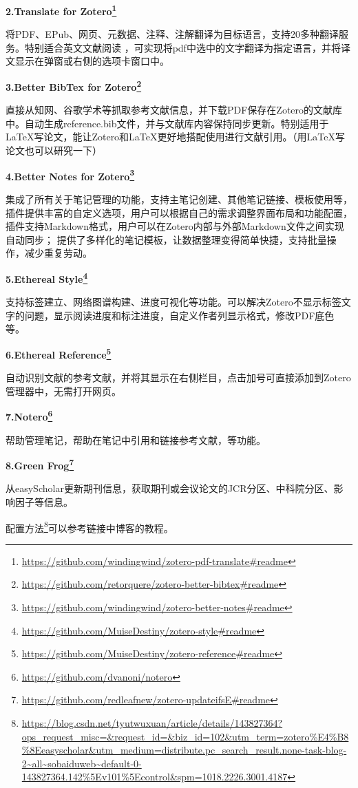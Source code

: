 \documentclass[]{ctexbook}
\renewcommand{\href}[2]{#2\footnote{\url{#1}}}
\theoremstyle{definition}
\theoremstyle{definition}
\theoremstyle{definition}
\theoremstyle{definition}
\theoremstyle{remark}
\begin{document}
\textbf{2.\href{https://github.com/windingwind/zotero-pdf-translate\#readme}{Translate for Zotero}}

将PDF、EPub、网页、元数据、注释、注解翻译为目标语言，支持20多种翻译服务。特别适合英文文献阅读 ，可实现将pdf中选中的文字翻译为指定语言，并将译文显示在弹窗或右侧的选项卡窗口中。

\textbf{3.\href{https://github.com/retorquere/zotero-better-bibtex\#readme}{Better BibTex for Zotero}}

直接从知网、谷歌学术等抓取参考文献信息，并下载PDF保存在Zotero的文献库中。自动生成reference.bib文件，并与文献库内容保持同步更新。特别适用于LaTeX写论文，能让Zotero和LaTeX更好地搭配使用进行文献引用。（用LaTeX写论文也可以研究一下）

\textbf{4.\href{https://github.com/windingwind/zotero-better-notes\#readme}{Better Notes for Zotero}}

集成了所有关于笔记管理的功能，支持主笔记创建、其他笔记链接、模板使用等，插件提供丰富的自定义选项，用户可以根据自己的需求调整界面布局和功能配置，插件支持Markdown格式，用户可以在Zotero内部与外部Markdown文件之间实现自动同步； 提供了多样化的笔记模板，让数据整理变得简单快捷，支持批量操作，减少重复劳动。

\textbf{5.\href{https://github.com/MuiseDestiny/zotero-style\#readme}{Ethereal Style}}

支持标签建立、网络图谱构建、进度可视化等功能。可以解决Zotero不显示标签文字的问题，显示阅读进度和标注进度，自定义作者列显示格式，修改PDF底色等。

\textbf{6.\href{https://github.com/MuiseDestiny/zotero-reference\#readme}{Ethereal Reference}}

自动识别文献的参考文献，并将其显示在右侧栏目，点击加号可直接添加到Zotero管理器中，无需打开网页。

\textbf{7.\href{https://github.com/dvanoni/notero}{Notero}}

帮助管理笔记，帮助在笔记中引用和链接参考文献，等功能。

\textbf{8.\href{https://github.com/redleafnew/zotero-updateifsE\#readme}{Green Frog}}

从easyScholar更新期刊信息，获取期刊或会议论文的JCR分区、中科院分区、影响因子等信息。

\href{https://blog.csdn.net/tyutwuxuan/article/details/143827364?ops_request_misc=&request_id=&biz_id=102&utm_term=zotero\%E4\%B8\%8Eeasyscholar&utm_medium=distribute.pc_search_result.none-task-blog-2~all~sobaiduweb~default-0-143827364.142\%5Ev101\%5Econtrol&spm=1018.2226.3001.4187}{配置方法}可以参考链接中博客的教程。
\end{document}
